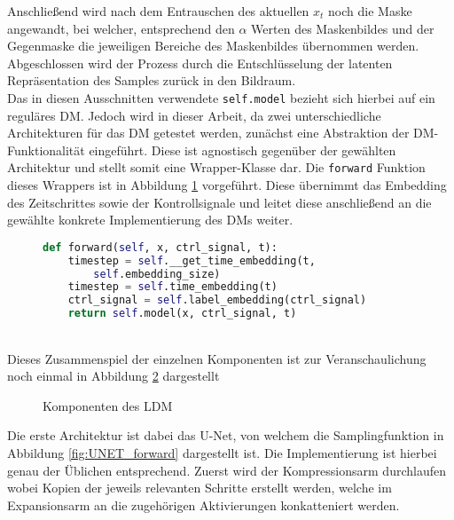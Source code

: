 Anschließend wird nach dem Entrauschen des aktuellen $x_t$ noch die Maske angewandt, bei welcher, entsprechend den $\alpha$ Werten des Maskenbildes und der Gegenmaske die jeweiligen Bereiche des Maskenbildes übernommen werden. \\
Abgeschlossen wird der Prozess durch die Entschlüsselung der latenten Repräsentation des Samples zurück in den Bildraum. \\
Das in diesen Ausschnitten verwendete \texttt{self.model} bezieht sich hierbei auf ein reguläres \ac{DM}. Jedoch wird in dieser Arbeit, da zwei unterschiedliche Architekturen für das DM getestet werden, zunächst eine Abstraktion der DM-Funktionalität eingeführt. Diese ist agnostisch gegenüber der gewählten Architektur und stellt somit eine Wrapper-Klasse dar. Die \texttt{forward} Funktion dieses Wrappers ist in Abbildung \ref{fig:DM_forward} vorgeführt. Diese übernimmt das Embedding des Zeitschrittes sowie der Kontrollsignale und leitet diese anschließend an die gewählte konkrete Implementierung des \ac{DM}s weiter. 
\begin{figure}[htbp]
\begin{lstlisting}[language=python]
def forward(self, x, ctrl_signal, t):
    timestep = self.__get_time_embedding(t, 
        self.embedding_size)
    timestep = self.time_embedding(t)
    ctrl_signal = self.label_embedding(ctrl_signal)
    return self.model(x, ctrl_signal, t)
\end{lstlisting}
    \captionsetup{type=figure}
    \label{fig:DM_forward}
\end{figure} \\
Dieses Zusammenspiel der einzelnen Komponenten ist zur Veranschaulichung noch einmal in Abbildung \ref{fig:LDM_arch} dargestellt
\begin{figure}[htbp]
    \centering
    \caption{Komponenten des \ac{LDM}}
    \label{fig:LDM_arch}
\end{figure}
Die erste Architektur ist dabei das U-Net, von welchem die Samplingfunktion in Abbildung \ref{fig:UNET_forward} dargestellt ist. Die Implementierung ist hierbei genau der Üblichen entsprechend. Zuerst wird der Kompressionsarm durchlaufen wobei Kopien der jeweils relevanten Schritte erstellt werden, welche im Expansionsarm an die zugehörigen Aktivierungen konkatteniert werden.  
